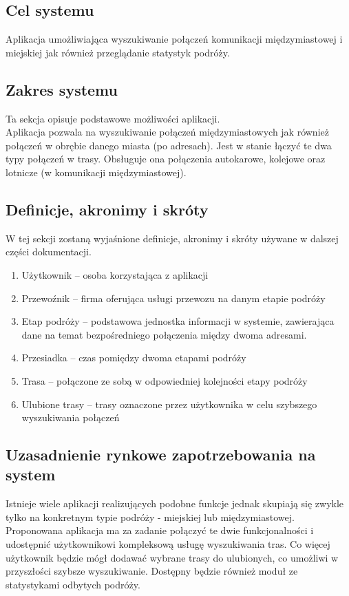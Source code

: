 \documentclass[12pt,a4paper]{report}
\begin{document}
\subsection{Cel systemu}
	Aplikacja umożliwiająca wyszukiwanie połączeń komunikacji międzymiastowej i miejskiej jak również przeglądanie statystyk podróży.
\subsection{Zakres systemu}
	Ta sekcja opisuje podstawowe możliwości aplikacji.\\[0.3cm]
	Aplikacja pozwala na wyszukiwanie połączeń międzymiastowych jak również połączeń w obrębie danego miasta (po adresach). Jest w stanie łączyć te dwa typy połączeń w trasy. Obsługuje ona połączenia autokarowe, kolejowe oraz lotnicze (w komunikacji międzymiastowej).
\subsection{Definicje, akronimy i skróty}
	W tej sekcji zostaną wyjaśnione definicje, akronimy i skróty używane w dalszej części dokumentacji.
\begin{enumerate}
	\item Użytkownik -- osoba korzystająca z aplikacji
	\item Przewoźnik -- firma oferująca usługi przewozu na danym etapie podróży
	\item Etap podróży -- podstawowa jednostka informacji w systemie, zawierająca dane na temat bezpośredniego połączenia między dwoma adresami.
	\item Przesiadka -- czas pomiędzy dwoma etapami podróży
	\item Trasa -- połączone ze sobą w odpowiedniej kolejności etapy podróży
	\item Ulubione trasy -- trasy oznaczone przez użytkownika w celu szybszego wyszukiwania połączeń
\end{enumerate}
\subsection{Uzasadnienie rynkowe zapotrzebowania na system}
	Istnieje wiele aplikacji realizujących podobne funkcje jednak skupiają się zwykle tylko na konkretnym typie podróży - miejskiej lub międzymiastowej. Proponowana aplikacja ma za zadanie połączyć te dwie funkcjonalności i udostępnić użytkownikowi kompleksową usługę wyszukiwania tras. Co więcej użytkownik będzie mógł dodawać wybrane trasy do ulubionych, co umożliwi w przyszłości szybsze wyszukiwanie. Dostępny będzie również moduł ze statystykami odbytych podróży.
\newpage
\end{document}
